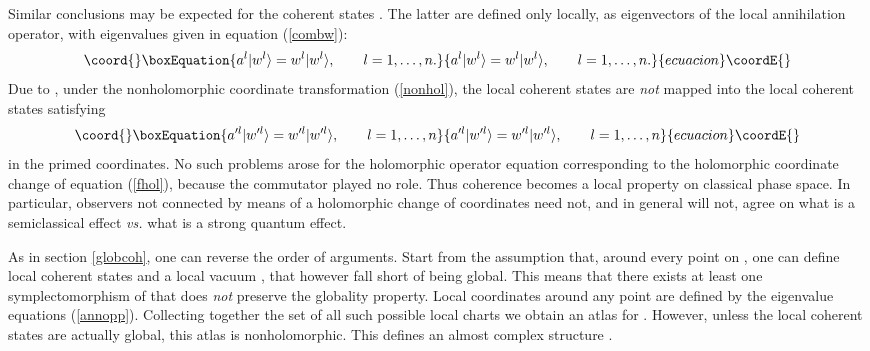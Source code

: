 \documentclass[a4paper,a4paper]{article}
\begin{document}
Similar conclusions may be expected for the coherent states \coordHE{}. 
The latter are defined only locally, as eigenvectors of the local annihilation 
operator, with eigenvalues given in equation (\ref{combw}):
\begin{equation}\coord{}\boxEquation{
a^l|w^l\rangle=w^l|w^l\rangle,\qquad l=1,\ldots, n.
\label{annopp}
}{
a^l|w^l\rangle=w^l|w^l\rangle,\qquad l=1,\ldots, n.
}{ecuacion}\coordE{}\end{equation}
Due to \coordHE{}, under the nonholomorphic 
coordinate transformation (\ref{nonhol}), the local coherent states 
\coordHE{} are {\it not} mapped into the local coherent states 
satisfying
\begin{equation}\coord{}\boxEquation{
a'^l|w'^l\rangle=w'^l|w'^l\rangle,\qquad l=1,\ldots, n
\label{annoppp}
}{
a'^l|w'^l\rangle=w'^l|w'^l\rangle,\qquad l=1,\ldots, n
}{ecuacion}\coordE{}\end{equation}
in the primed coordinates. No such problems arose for the holomorphic operator 
equation \coordHE{} corresponding to the holomorphic coordinate change \coordHE{} 
of equation (\ref{fhol}), because the commutator \coordHE{} 
played no role. Thus coherence becomes a local property on classical phase space.
In particular,  observers not connected by means of a holomorphic change 
of coordinates need not, and in general will not, agree on what is a semiclassical 
effect {\it vs.} what is a strong quantum effect. 

As in section \ref{globcoh}, one can reverse the order of arguments. 
Start from the assumption that, around every point on \coordHE{}, one can define local 
coherent states \coordHE{} and a local vacuum \myHighlight{$|0\rangle$}\coordHE{}, that however fall short
of being global. This means that there exists at least one symplectomorphism of \coordHE{}
that does {\it not}\/ preserve the globality property. Local coordinates \coordHE{} around 
any point are defined by the eigenvalue equations (\ref{annopp}). Collecting together 
the set of all such possible local charts we obtain an atlas for \coordHE{}. 
However, unless the local coherent states \coordHE{} are actually global, 
this atlas is nonholomorphic. This defines an almost complex structure \coordHE{}.
\end{document}
